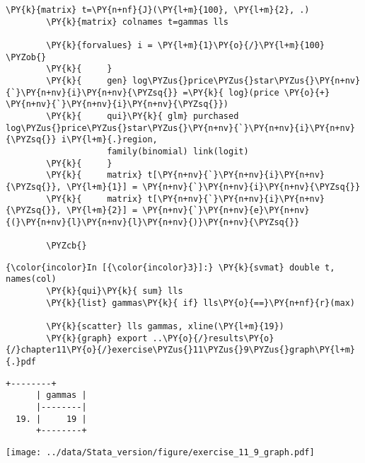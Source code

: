 \documentclass[11pt,notitlepage]{article}\usepackage[]{graphicx}\usepackage[]{color}
\makeatletter
\newenvironment{kframe}{%
 \def\at@end@of@kframe{}%
 \ifinner\ifhmode%
  \def\at@end@of@kframe{\end{minipage}}%
  \begin{minipage}{\columnwidth}%
 \fi\fi%
 \def\FrameCommand##1{\hskip\@totalleftmargin \hskip-\fboxsep
 \colorbox{shadecolor}{##1}\hskip-\fboxsep
     \hskip-\linewidth \hskip-\@totalleftmargin \hskip\columnwidth}%
 \MakeFramed {\advance\hsize-\width
   \@totalleftmargin\z@ \linewidth\hsize
   \@setminipage}}%
 {\par\unskip\endMakeFramed%
 \at@end@of@kframe}
\newenvironment{knitrout}{}{} %
\makeatother
\begin{document}
\begin{enumerate}[a)]
\begin{knitrout}
\begin{kframe}
\begin{Verbatim}[commandchars=\\\{\}]
        \PY{k}{matrix} t=\PY{n+nf}{J}(\PY{l+m}{100}, \PY{l+m}{2}, .)
        \PY{k}{matrix} colnames t=gammas lls
            
        \PY{k}{forvalues} i = \PY{l+m}{1}\PY{o}{/}\PY{l+m}{100} \PYZob{}
        \PY{k}{		}
        \PY{k}{		gen} log\PYZus{}price\PYZus{}star\PYZus{}\PY{n+nv}{`}\PY{n+nv}{i}\PY{n+nv}{\PYZsq{}} =\PY{k}{ log}(price \PY{o}{+} \PY{n+nv}{`}\PY{n+nv}{i}\PY{n+nv}{\PYZsq{}})
        \PY{k}{		qui}\PY{k}{ glm} purchased log\PYZus{}price\PYZus{}star\PYZus{}\PY{n+nv}{`}\PY{n+nv}{i}\PY{n+nv}{\PYZsq{}} i\PY{l+m}{.}region, 
        			family(binomial) link(logit)
        \PY{k}{		}
        \PY{k}{		matrix} t[\PY{n+nv}{`}\PY{n+nv}{i}\PY{n+nv}{\PYZsq{}}, \PY{l+m}{1}] = \PY{n+nv}{`}\PY{n+nv}{i}\PY{n+nv}{\PYZsq{}}
        \PY{k}{		matrix} t[\PY{n+nv}{`}\PY{n+nv}{i}\PY{n+nv}{\PYZsq{}}, \PY{l+m}{2}] = \PY{n+nv}{`}\PY{n+nv}{e}\PY{n+nv}{(}\PY{n+nv}{l}\PY{n+nv}{l}\PY{n+nv}{)}\PY{n+nv}{\PYZsq{}}
        
        \PYZcb{}
\end{Verbatim}

    \begin{Verbatim}[commandchars=\\\{\}]
{\color{incolor}In [{\color{incolor}3}]:} \PY{k}{svmat} double t, names(col)     
        \PY{k}{qui}\PY{k}{ sum} lls
        \PY{k}{list} gammas\PY{k}{ if} lls\PY{o}{==}\PY{n+nf}{r}(max)
           
        \PY{k}{scatter} lls gammas, xline(\PY{l+m}{19})
        \PY{k}{graph} export ..\PY{o}{/}results\PY{o}{/}chapter11\PY{o}{/}exercise\PYZus{}11\PYZus{}9\PYZus{}graph\PY{l+m}{.}pdf
\end{Verbatim}

    \begin{Verbatim}[commandchars=\\\{\}]
      +--------+
      | gammas |
      |--------|
  19. |     19 |
      +--------+

    \end{Verbatim}
\end{kframe}

{\centering \texttt{[image: ../data/Stata\_version/figure/exercise\_11\_9\_graph.pdf]} 

}



\end{knitrout}



\end{enumerate}
\end{document}
